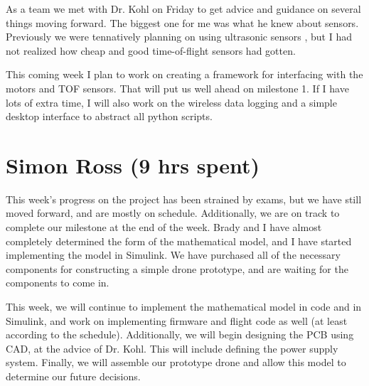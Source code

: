 \documentclass[12pt, titlepage]{article}
\begin{document}
As a team we met with Dr. Kohl on Friday to get advice and guidance on several things moving forward. The biggest one for me was what he knew about sensors. Previously we were tennatively planning on using ultrasonic sensors , but I had not realized how cheap and good time-of-flight sensors had gotten.  

This coming week I plan to work on creating a framework for interfacing with the motors and TOF sensors. That will put us well ahead on milestone 1. If I have lots of extra time, I will also work on the wireless data logging and a simple desktop interface to abstract all python scripts.

\section*{Simon Ross (9 hrs spent)}

This week's progress on the project has been strained by exams, but we have still moved forward, and are mostly on schedule. Additionally, we are on track to complete our milestone at the end of the week. Brady and I have almost completely determined the form of the mathematical model, and I have started implementing the model in Simulink. We have purchased all of the necessary components for constructing a simple drone prototype, and are waiting for the components to come in. 

This week, we will continue to implement the mathematical model in code and in Simulink, and work on implementing firmware and flight code as well (at least according to the schedule). Additionally, we will begin designing the PCB using CAD, at the advice of Dr. Kohl. This will include defining the power supply system. Finally, we will assemble our prototype drone and allow this model to determine our future decisions. 
\end{document}
